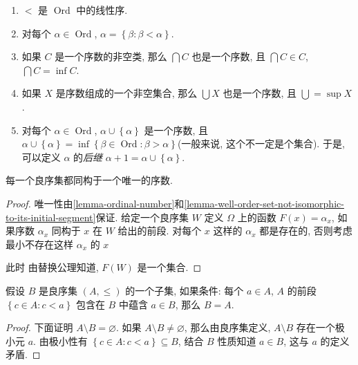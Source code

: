 \begin{proposition}
  \begin{enumerate}
    \item \( < \) 是 \( \operatorname{Ord} \) 中的线性序.
    \item 对每个 \( \alpha \in \operatorname{Ord} \), \( \alpha = \left\lbrace
      \beta: \beta < \alpha \right\rbrace \).
    \item 如果 \( C \) 是一个序数的非空类, 那么 \( \bigcap C \) 也是一个序数,
      且 \( \bigcap C \in C \), \( \bigcap C = \inf C \).
    \item 如果 \( X \) 是序数组成的一个非空集合, 那么 \( \bigcup X \)
      也是一个序数, 且 \( \bigcup = \sup X \).
    \item 对每个 \( \alpha \in \operatorname{Ord} \), \( \alpha \cup
      \left\lbrace \alpha \right\rbrace \) 是一个序数, 且 \( \alpha \cup
      \left\lbrace \alpha \right\rbrace = \inf \left\lbrace \beta \in
        \operatorname{Ord}: \beta >
      \alpha \right\rbrace \)(一般来说, 这个不一定是个集合).
      于是, 可以定义 \( \alpha \) 的\emph{后继} \( \alpha + 1 = \alpha \cup
      \left\lbrace \alpha \right\rbrace \).
  \end{enumerate}
\end{proposition}

\begin{theorem}
  每一个良序集都同构于一个唯一的序数.
\end{theorem}
\begin{proof}
  唯一性由\cref{lemma-ordinal-number}和\cref{lemma-well-order-set-not-isomorphic-to-its-initial-segment}保证.
  给定一个良序集 \( W \) 定义 \( \Omega \) 上的函数 \( F(x) = \alpha_x \),
  如果序数 \( \alpha_x \) 同构于 \( x \) 在 \( W \) 给出的前段.
  对每个 \( x \) 这样的 \( \alpha_x \) 都是存在的, 否则考虑最小不存在这样 \(
  \alpha_x \) 的 \( x \)

  此时
  由替换公理知道, \( F(W) \) 是一个集合.
\end{proof}

\begin{theorem}[超限归纳法]
  假设 \( B \) 是良序集 \( (A, \leq) \) 的一个子集, 如果条件: 每个 \( a \in A \),
  \( A \) 的前段 \( \left\lbrace c \in A: c < a \right\rbrace \) 包含在 \(
  B \) 中蕴含 \( a \in B \), 那么 \( B = A \).
\end{theorem}
\begin{proof}
  下面证明 \( A \setminus B = \varnothing \).
  如果 \( A \setminus B \neq \varnothing \), 那么由良序集定义, \( A \setminus B
  \) 存在一个极小元 \( a \).
  由极小性有 \( \left\lbrace c \in A: c < a \right\rbrace \subseteq B \), 结合
  \( B \) 性质知道 \( a \in B \), 这与 \( a \) 的定义矛盾.
\end{proof}

